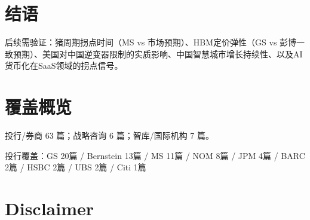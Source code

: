 \documentclass[11pt]{ctexart}
\begin{document}
\section{结语}
后续需验证：猪周期拐点时间（MS vs 市场预期）、HBM定价弹性（GS vs 彭博一致预期）、美国对中国逆变器限制的实质影响、中国智慧城市增长持续性、以及AI货币化在SaaS领域的拐点信号。
\newpage
\section{覆盖概览}
投行/券商 63 篇；战略咨询 6 篇；智库/国际机构 7 篇。\par
投行覆盖：GS 20篇 / Bernstein 13篇 / MS 11篇 / NOM 8篇 / JPM 4篇 / BARC 2篇 / HSBC 2篇 / UBS 2篇 / Citi 1篇\par
\section{Disclaimer}
\end{document}

